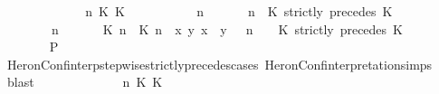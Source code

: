 \begin{isabellebody}
\ \ \ \ \isamarkupfalse%
\isanewline
\ \ \ \ \ \ \isamarkupfalse%
\ {\isasymGamma}\ n\ K\ K\ {\isasymPsi}\ {\isasymPhi}\isanewline
\ \ \ \ \ \ \isamarkupfalse%
\ {\isacartoucheopen}{\isacharparenleft}{\isasymGamma}\ n\ {\isasymturnstile}\ {\isasymPsi}\ {\isasymtriangleright}\ {\isasymPhi}\ {\isacharequal}\ {\isacharparenleft}{\isasymGamma}{\isacharcomma}\ n\ {\isasymturnstile}\ {\isacharparenleft}{\isacharparenleft}K\ strictly\ precedes\ K\ {\isacharhash}\ {\isasymPsi}{\isacharparenright}\ {\isasymtriangleright}\ {\isasymPhi}{\isacharparenright}{\isacartoucheclose}\isanewline
\ \ \ \ \ \ \ {\isacartoucheopen}{\isacharparenleft}{\isasymGamma}\ n\ {\isasymturnstile}\ {\isasymPsi}\ {\isasymtriangleright}\ {\isasymPhi}\ {\isacharequal}\ {\isacharparenleft}{\isacharparenleft}{\isacharparenleft}{\isasymlceil}{\isacharhash}\isactrlsup {\isasymle}\ K\ n{\isacharcomma}\ {\isacharhash}\isactrlsup {\isacharless}\ K\ n{\isasymrceil}\ {\isasymin}\ {\isacharparenleft}{\isasymlambda}{\isacharparenleft}x{\isacharcomma}\ y{\isacharparenright}{\isachardot}\ x\ {\isasymle}\ y{\isacharparenright}{\isacharparenright}\ {\isacharhash}\ {\isasymGamma}{\isacharparenright}{\isacharcomma}\ n\ {\isasymturnstile}\ {\isasymPsi}\ {\isasymtriangleright}\ {\isacharparenleft}{\isacharparenleft}K\ strictly\ precedes\ K\ {\isacharhash}\ {\isasymPhi}{\isacharparenright}{\isacharparenright}{\isacartoucheclose}\isanewline
\ \ \ \ \ \ \isamarkupfalse%
\ {\isacharquery}P\isanewline
\ \ \ \ \ \ \ \ \isamarkupfalse%
\ HeronConf{\isacharunderscore}interp{\isacharunderscore}stepwise{\isacharunderscore}strictly{\isacharunderscore}precedes{\isacharunderscore}cases\ HeronConf{\isacharunderscore}interpretation{\isachardot}simps\ \isamarkupfalse%
\ blast\isanewline
\ \ \ \ \isamarkupfalse%
\isanewline
\ \ \ \ \ \ \isamarkupfalse%
\ {\isasymGamma}\ n\ K\ K\ {\isasymPsi}\ {\isasymPhi}\isanewline

\end{isabellebody}
